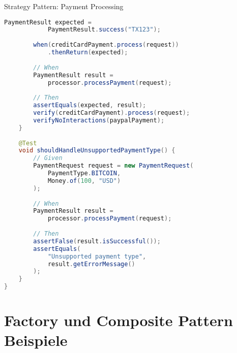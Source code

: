 \begin{example2}{Strategy Pattern: Payment Processing}
\begin{lstlisting}[language=Java, style=basesmol]
        PaymentResult expected = 
            PaymentResult.success("TX123");
            
        when(creditCardPayment.process(request))
            .thenReturn(expected);
        
        // When
        PaymentResult result = 
            processor.processPayment(request);
        
        // Then
        assertEquals(expected, result);
        verify(creditCardPayment).process(request);
        verifyNoInteractions(paypalPayment);
    }
    
    @Test
    void shouldHandleUnsupportedPaymentType() {
        // Given
        PaymentRequest request = new PaymentRequest(
            PaymentType.BITCOIN,
            Money.of(100, "USD")
        );
        
        // When
        PaymentResult result = 
            processor.processPayment(request);
        
        // Then
        assertFalse(result.isSuccessful());
        assertEquals(
            "Unsupported payment type",
            result.getErrorMessage()
        );
    }
}
\end{lstlisting}
\end{example2}

\section{Factory und Composite Pattern Beispiele}

